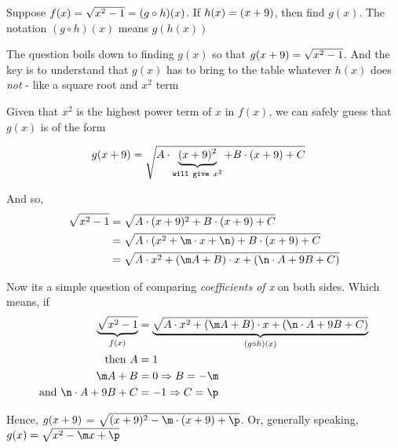 



\SQUARE{\vbtwo}{\n}
\gcalcexpr[0]\p{-(\vbone - \n)}

\question[4] Suppose $f(x) = \sqrt{x^2 - 1} = (g \circ h)(x)$. If $h(x) = (x + 9)$, 
then find $g(x)$. The notation $(g\circ h)(x)$ means $g(h(x))$


\watchout

\ifprintanswers
\fi 

\begin{solution}[\halfpage]
	The question boils down to finding $g(x)$ so that $g(x+9) = \sqrt{x^2-1}$. And the key 
	is to understand that $g(x)$ has to bring to the table whatever $h(x)$ does \textit{not} - like 
	a square root and $x^2$ term 
	
	Given that $x^2$ is the highest power term of $x$ in $f(x)$, we can safely guess that 
	$g(x)$ is of the form 
	
	\begin{align}
		g(x + 9) &= \sqrt{A\cdot\underbrace{(x + 9)^2}_{\texttt{will give } x^2} 
		+ B\cdot(x + 9) + C}
	\end{align}			
	
	
	And so,
	\begin{align}
		\sqrt{x^2 - \vbone} &= \sqrt{A\cdot(x + \vbtwo)^2 + B\cdot(x + \vbtwo) + C} \\ 
		 &= \sqrt{A\cdot(x^2 + \m\cdot x + \n) + B\cdot(x + \vbtwo) + C} \\
		 &= \sqrt{A\cdot x^2 + (\m A + B)\cdot x + (\n\cdot A + \vbtwo B + C)}
	\end{align}
	
	Now its a simple question of comparing \textit{coefficients of x} on both sides. 
	Which means, if 
	\begin{align}
		\underbrace{\sqrt{x^2 - \vbone}}_{f(x)} &= 
		\underbrace{\sqrt{A\cdot x^2 + (\m A + B)\cdot x + (\n\cdot A + \vbtwo B + C)}}_{(g\circ h)(x)} \\
		\text{then } A &= 1 \\
		\m A + B &= 0 \Rightarrow B = -\m \\
		\text{and } \n\cdot A + \vbtwo B + C &= -\vbone \Rightarrow C = \p
	\end{align}
	
	Hence, $g(x + 9)$ = $\sqrt{(x+\vbtwo)^2 -\m\cdot(x + \vbtwo) + \p}$. Or, generally speaking, 
	$g(x) = \sqrt{x^2 - \m x + \p}$
	
\end{solution}


